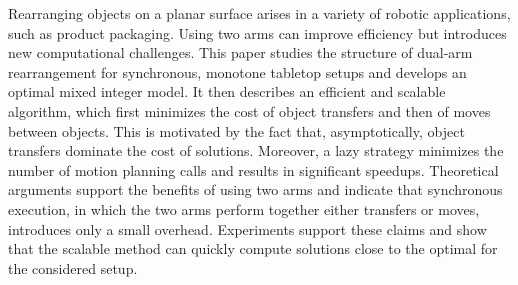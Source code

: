 Rearranging objects on a planar surface arises in a variety of
robotic applications, such as product packaging.  Using two arms can improve
efficiency but introduces new computational challenges. This paper
studies the structure of dual-arm rearrangement for synchronous,
monotone tabletop setups and develops an optimal mixed integer model. It then
describes an efficient and scalable algorithm, which first minimizes
the cost of object transfers and then of moves between objects.
This is motivated by the fact that, asymptotically, object transfers
dominate the cost of solutions. Moreover, a lazy strategy minimizes
the number of motion planning calls and results in significant
speedups.  Theoretical arguments support the benefits of using two
arms and indicate that synchronous execution, in which the two arms perform together either transfers or moves, introduces only a small
overhead.  Experiments support these claims and show that the
scalable method can quickly compute solutions close to the optimal for
the considered setup.
